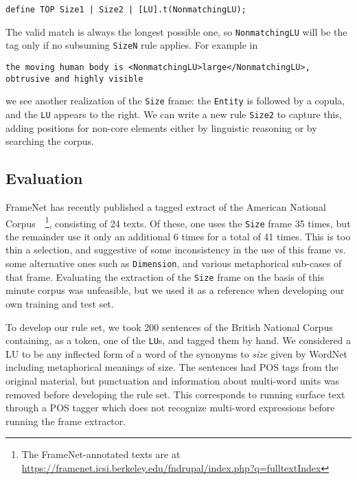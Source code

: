 \documentclass{llncs}
\begin{document}
\begin{center}
  \small
  \begin{framed}
\begin{verbatim}
define TOP Size1 | Size2 | [LU].t(NonmatchingLU);
\end{verbatim}
  \end{framed}
\end{center}
\normalsize

The valid match is always the longest possible one, so \verb+NonmatchingLU+ will be the tag only if no subsuming \verb+SizeN+ rule applies.
For example in

\begin{center}
\small
\begin{framed}
\begin{verbatim}
the moving human body is <NonmatchingLU>large</NonmatchingLU>,
obtrusive and highly visible
\end{verbatim}
\end{framed}
\end{center}
\normalsize

\noindent we see another realization of the \verb+Size+ frame: the \verb+Entity+ is followed by a
copula, and the \verb+LU+ appears to the right. We can write a new rule
\verb+Size2+ to capture this, adding positions for non-core elements either by
linguistic reasoning or by searching the corpus.

\subsection{Evaluation}

FrameNet has recently published a tagged extract of the American National
Corpus~\cite{anc}~\footnote{The FrameNet-annotated texts are at\\\url{https://framenet.icsi.berkeley.edu/fndrupal/index.php?q=fulltextIndex}},
consisting of 24 texts. Of these, one uses the \verb+Size+ frame 35 times, but the remainder use it only an additional 6 times
for a total of 41 times. This is too thin a selection, and suggestive of some inconsistency in the use of this frame vs.\@
some alternative ones such as \verb+Dimension+, and various metaphorical sub-cases of that frame.
Evaluating the extraction of the \verb+Size+ frame on the basis of this minute corpus was unfeasible, 
but we used it as a reference when developing our own training and test set.

To develop our rule set, we took 200 sentences of the British National
Corpus containing, as a token, one of the \verb+LU+s, and tagged them by hand.
We considered a LU to be any inflected form of a word of the synonyms to \emph{size} given by WordNet
including metaphorical meanings of size.
The sentences had POS tags from the original material, but punctuation
and information about multi-word units was removed before developing
the rule set. This corresponds to running surface text through a POS tagger which does not recognize multi-word expressions before
running the frame extractor.
\end{document}
